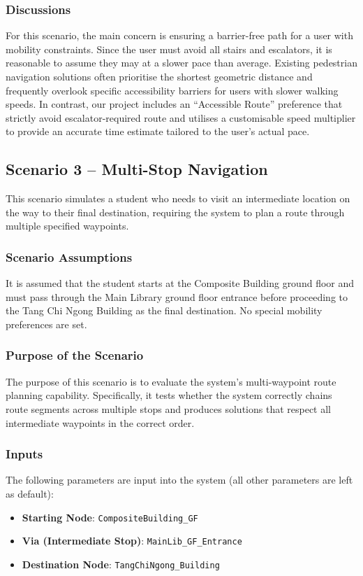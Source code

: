 \documentclass[a4paper,10pt]{amsart}
\begin{document}
\subsubsection{Discussions}
For this scenario, the main concern is ensuring a barrier-free path for a user with mobility constraints.
Since the user must avoid all stairs and escalators, it is reasonable to assume they may at a slower pace than average.
Existing pedestrian navigation solutions often prioritise the shortest geometric distance and frequently overlook specific accessibility barriers for users with slower walking speeds.
In contrast, our project includes an ``Accessible Route'' preference that strictly avoid escalator-required route and utilises a customisable speed multiplier to provide an accurate time estimate tailored to the user's actual pace.

\subsection{Scenario 3 -- Multi-Stop Navigation}
This scenario simulates a student who needs to visit an intermediate location on the way to their final destination, requiring the system to plan a route through multiple specified waypoints.

\subsubsection{Scenario Assumptions}
It is assumed that the student starts at the Composite Building ground floor and must pass through the Main Library ground floor entrance before proceeding to the Tang Chi Ngong Building as the final destination.
No special mobility preferences are set.

\subsubsection{Purpose of the Scenario}
The purpose of this scenario is to evaluate the system's multi-waypoint route planning capability.
Specifically, it tests whether the system correctly chains route segments across multiple stops and produces solutions that respect all intermediate waypoints in the correct order.

\subsubsection{Inputs}
The following parameters are input into the system (all other parameters are left as default):
\begin{itemize}
    \item \textbf{Starting Node}: \texttt{CompositeBuilding\_GF}
    \item \textbf{Via (Intermediate Stop)}: \texttt{MainLib\_GF\_Entrance}
    \item \textbf{Destination Node}: \texttt{TangChiNgong\_Building}
\end{itemize}
\end{document}
